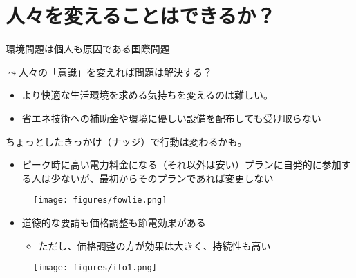 \documentclass[
  xelatex,
  ja=standard]{bxjsarticle}
\providecommand{\tightlist}{%
  \setlength{\itemsep}{0pt}\setlength{\parskip}{0pt}}\usepackage{longtable,booktabs,array}
\begin{document}
\hypertarget{ux4ebaux3005ux3092ux5909ux3048ux308bux3053ux3068ux306fux3067ux304dux308bux304b}{%
\section{人々を変えることはできるか？}\label{ux4ebaux3005ux3092ux5909ux3048ux308bux3053ux3068ux306fux3067ux304dux308bux304b}}

環境問題は個人も原因である国際問題

\(\leadsto\)人々の「意識」を変えれば問題は解決する？

\begin{itemize}
\tightlist
\item
  より快適な生活環境を求める気持ちを変えるのは難しい。
\item
  省エネ技術への補助金や環境に優しい設備を配布しても受け取らない\citep{fowlie2018, hanna2016}
\end{itemize}

ちょっとしたきっかけ（ナッジ）で行動は変わるかも。

\begin{itemize}
\tightlist
\item
  ピーク時に高い電力料金になる（それ以外は安い）プランに自発的に参加する人は少ないが、最初からそのプランであれば変更しない\citep{fowlie2021}
\end{itemize}

\begin{figure}[htpb]

{\centering \texttt{[image: figures/fowlie.png]}

}

\caption{\citet{fowlie2021}}

\end{figure}

\begin{itemize}
\tightlist
\item
  道徳的な要請も価格調整も節電効果がある\citetext{\citealp[第2章]{ito2017}; \citealp{ito2018}}

  \begin{itemize}
  \tightlist
  \item
    ただし、価格調整の方が効果は大きく、持続性も高い
  \end{itemize}
\end{itemize}

\begin{figure}[htpb]

{\centering \texttt{[image: figures/ito1.png]}

}

\caption{\citet{ito2018}}

\end{figure}
\end{document}
